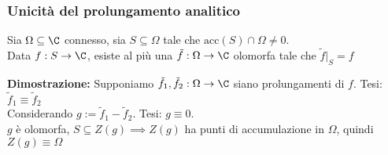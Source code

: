 \subsubsection{Unicità del prolungamento analitico}
\begin{tcolorbox}
	Sia $\Omega \subseteq  \C$ connesso, sia $S \subseteq  \Omega$ tale che $\text{acc}(S)\cap \Omega \neq 0$.
	\\Data $f:S\to \C$, esiste al più una $\tilde f:\Omega\to \C$ olomorfa tale che $\tilde f|_S=f$
\end{tcolorbox}
\textbf{Dimostrazione: }Supponiamo $\tilde f_1,\tilde f_2:\Omega\to \C$ siano prolungamenti di $f$. Tesi: $\tilde f_1\equiv \tilde f_2$
\\Considerando $g:=\tilde f_1-\tilde f_2$. Tesi: $g\equiv 0$.
\\$g$ è olomorfa, $S \subseteq  Z(g)\implies Z(g)$ ha punti di accumulazione in $\Omega$, quindi $Z(g)\equiv \Omega$ 
